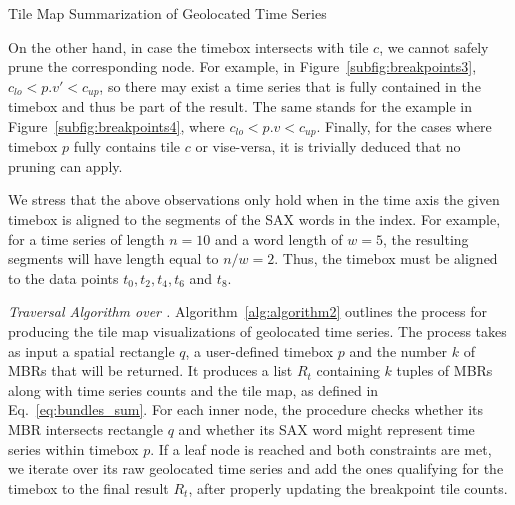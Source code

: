 \begin{algorithm}[ht!]
{	}
	\vspace{6pt}
	\caption{Tile Map Summarization of Geolocated Time Series}
	\label{alg:algorithm2}
\end{algorithm}



On the other hand, in case the timebox intersects with tile $c$, we cannot safely prune the corresponding node. For example, in Figure~\ref{subfig:breakpoints3}, $c_{lo} < p.v' < c_{up}$, so there may exist a time series that is fully contained in the timebox and thus be part of the result. The same stands for the example in Figure~\ref{subfig:breakpoints4}, where  $c_{lo} < p.v < c_{up}$. Finally, for the cases where timebox $p$ fully contains tile $c$ or vise-versa, it is trivially deduced that no pruning can apply.

We stress that the above observations only hold when in the time axis the given timebox is aligned to the segments of the SAX words in the index. For example, for a time series of length $n=10$ and a word length of $w=5$, the resulting segments will have length equal to $n/w=2$. Thus, the timebox must be aligned to the data points $t_0, t_2, t_4, t_6$ and $t_8$.

\vspace{3mm}

\emph{Traversal Algorithm over \hisax.} Algorithm~\ref{alg:algorithm2} outlines the process for producing the tile map visualizations of geolocated time series. The process takes as input a spatial rectangle $q$, a user-defined timebox $p$ and the number $k$ of MBRs that will be returned. It produces a list $R_t$ containing $k$ tuples of MBRs along with time series counts and the tile map, as defined in Eq.~\ref{eq:bundles_sum}. For each inner node, the procedure checks whether its MBR intersects rectangle $q$ and whether its SAX word might represent time series within timebox $p$. If a leaf node is reached and both constraints are met, we iterate over its raw geolocated time series and add the ones qualifying for the timebox to the final result $R_t$, after properly updating the breakpoint tile counts.

